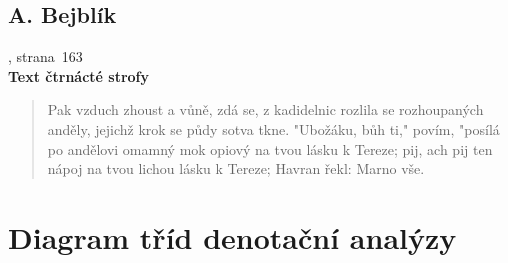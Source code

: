 \documentclass[dp.tex]{subfiles}
\begin{document}
\section*{A. Bejblík}
, strana~163
\\\textbf{Text čtrnácté strofy}
\begin{verse}
Pak vzduch zhoust a vůně, zdá se, z kadidelnic rozlila se
rozhoupaných anděly, jejichž krok se půdy sotva tkne.
"Ubožáku, bůh ti," povím, "posílá po andělovi
omamný mok opiový na tvou lásku k Tereze;
pij, ach pij ten nápoj na tvou lichou lásku k Tereze;
Havran řekl: Marno vše.
\end{verse}

\chapter{Diagram tříd denotační analýzy}
\label{appendix:class-diagram}
\end{document}
